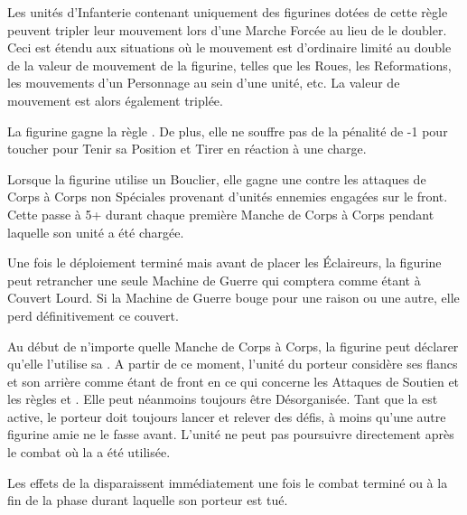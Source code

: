 \closearmywiderules



\vspace*{1.5cm}
\startarmyspecialrules

\armyspecialruleentry{\relentless}

Les unités d'Infanterie contenant uniquement des figurines dotées de cette règle peuvent tripler leur mouvement lors d'une Marche Forcée au lieu de le doubler. Ceci est étendu aux situations où le mouvement est d'ordinaire limité au double de la valeur de mouvement de la figurine, telles que les Roues, les Reformations, les mouvements d'un Personnage au sein d'une unité, etc. La valeur de mouvement est alors également triplée.

\armyspecialruleentry{\sturdy}

La figurine gagne la règle \thunderouscharge{}. De plus, elle ne souffre pas de la pénalité de -1 pour toucher pour Tenir sa Position et Tirer en réaction à une charge. 

\armyspecialruleentry{\shieldwall}

Lorsque la figurine utilise un Bouclier, elle gagne une  contre les attaques de Corps à Corps non Spéciales provenant d'unités ennemies engagées sur le front. Cette \wardsave{} passe à 5+ durant chaque première Manche de Corps à Corps pendant laquelle son unité a été chargée. 

\armyspecialruleentry{\entrench}

Une fois le déploiement terminé mais avant de placer les Éclaireurs, la figurine peut retrancher une seule Machine de Guerre qui comptera comme étant à Couvert Lourd. Si la Machine de Guerre bouge pour une raison ou une autre, elle perd définitivement ce couvert.

\armyspecialruleentry{\holdstone}

Au début de n'importe quelle Manche de Corps à Corps, la figurine peut déclarer qu'elle l'utilise sa \holdstone{}. A partir de ce moment, l'unité du porteur considère ses flancs et son arrière comme étant de front en ce qui concerne les Attaques de Soutien et les règles \parry{} et \shieldwall{}. Elle peut néanmoins toujours être Désorganisée. Tant que la \holdstone{} est active, le porteur doit toujours lancer et relever des défis, à moins qu'une autre figurine amie ne le fasse avant. L'unité ne peut pas poursuivre directement après le combat où la \holdstone{} a été utilisée.

Les effets de la \holdstone{} disparaissent immédiatement une fois le combat terminé ou à la fin de la phase durant laquelle son porteur est tué.

